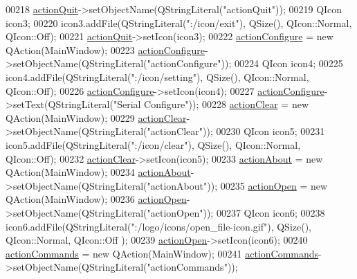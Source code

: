 \begin{DoxyCode}
00218         \hyperlink{a00027_a188c243f36a2dbc10e4e2a0ad94273b1}{actionQuit}->setObjectName(QStringLiteral(\textcolor{stringliteral}{"actionQuit"}));
00219         QIcon icon3;
00220         icon3.addFile(QStringLiteral(\textcolor{stringliteral}{":/icon/exit"}), QSize(), QIcon::Normal, QIcon::Off);
00221         \hyperlink{a00027_a188c243f36a2dbc10e4e2a0ad94273b1}{actionQuit}->setIcon(icon3);
00222         \hyperlink{a00027_a3860abde3cfd3f6170e28fddde73f11e}{actionConfigure} = \textcolor{keyword}{new} QAction(MainWindow);
00223         \hyperlink{a00027_a3860abde3cfd3f6170e28fddde73f11e}{actionConfigure}->setObjectName(QStringLiteral(\textcolor{stringliteral}{"actionConfigure"}));
00224         QIcon icon4;
00225         icon4.addFile(QStringLiteral(\textcolor{stringliteral}{":/icon/setting"}), QSize(), QIcon::Normal, QIcon::Off);
00226         \hyperlink{a00027_a3860abde3cfd3f6170e28fddde73f11e}{actionConfigure}->setIcon(icon4);
00227         \hyperlink{a00027_a3860abde3cfd3f6170e28fddde73f11e}{actionConfigure}->setText(QStringLiteral(\textcolor{stringliteral}{"Serial Configure"}));
00228         \hyperlink{a00027_ac8539dcd87955047877cb256aff60453}{actionClear} = \textcolor{keyword}{new} QAction(MainWindow);
00229         \hyperlink{a00027_ac8539dcd87955047877cb256aff60453}{actionClear}->setObjectName(QStringLiteral(\textcolor{stringliteral}{"actionClear"}));
00230         QIcon icon5;
00231         icon5.addFile(QStringLiteral(\textcolor{stringliteral}{":/icon/clear"}), QSize(), QIcon::Normal, QIcon::Off);
00232         \hyperlink{a00027_ac8539dcd87955047877cb256aff60453}{actionClear}->setIcon(icon5);
00233         \hyperlink{a00027_abdf2b43167c2cd0d3405f90b8c30e934}{actionAbout} = \textcolor{keyword}{new} QAction(MainWindow);
00234         \hyperlink{a00027_abdf2b43167c2cd0d3405f90b8c30e934}{actionAbout}->setObjectName(QStringLiteral(\textcolor{stringliteral}{"actionAbout"}));
00235         \hyperlink{a00027_a5772f39001f62b7f601aafe72caa10c0}{actionOpen} = \textcolor{keyword}{new} QAction(MainWindow);
00236         \hyperlink{a00027_a5772f39001f62b7f601aafe72caa10c0}{actionOpen}->setObjectName(QStringLiteral(\textcolor{stringliteral}{"actionOpen"}));
00237         QIcon icon6;
00238         icon6.addFile(QStringLiteral(\textcolor{stringliteral}{":/logo/icons/open\_file-icon.gif"}), QSize(), QIcon::Normal, QIcon::Off
      );
00239         \hyperlink{a00027_a5772f39001f62b7f601aafe72caa10c0}{actionOpen}->setIcon(icon6);
00240         \hyperlink{a00027_a3dccdc21d3df68b86550093b5e3c0356}{actionCommands} = \textcolor{keyword}{new} QAction(MainWindow);
00241         \hyperlink{a00027_a3dccdc21d3df68b86550093b5e3c0356}{actionCommands}->setObjectName(QStringLiteral(\textcolor{stringliteral}{"actionCommands"}));

\end{DoxyCode}
